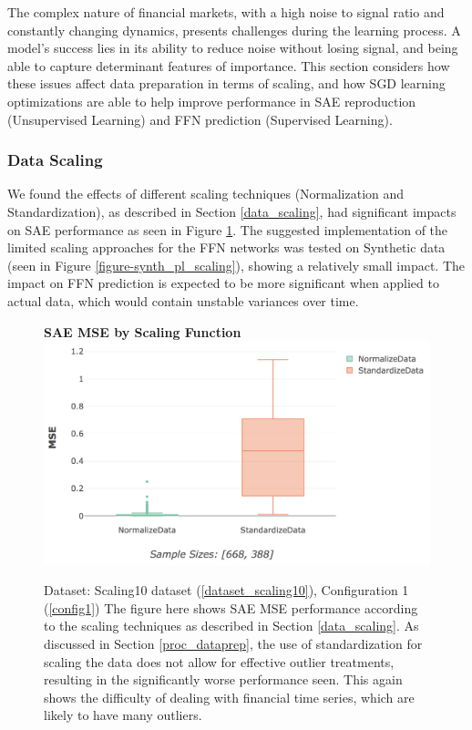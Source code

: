 \documentclass[a4paper,11pt,oneside]{article}
\theoremstyle{plain}
\theoremstyle{definition}
\begin{document}
	The complex nature of financial markets, with a high noise to signal ratio and constantly changing dynamics, presents challenges during the learning process. A model's success lies in its ability to reduce noise without losing signal, and being able to capture determinant features of importance. This section considers how these issues affect data preparation in terms of scaling, and how SGD learning optimizations are able to help improve performance in SAE reproduction (Unsupervised Learning) and FFN prediction (Supervised Learning).
	
	\subsubsection{Data Scaling}
	
	We found the effects of different scaling techniques (Normalization and Standardization), as described in Section \ref{data_scaling}, had significant impacts on SAE performance as seen in Figure \ref{figure-actual_mse_scaling}. The suggested implementation of the limited scaling approaches for the FFN networks was tested on Synthetic data (seen in Figure \ref{figure-synth_pl_scaling}), showing a relatively small impact. The impact on FFN prediction is expected to be more significant when applied to actual data, which would contain unstable variances over time.
		
	\begin{figure}[H]
		\centering 
		\textbf{SAE MSE by Scaling Function}
		\includegraphics[scale=0.4]{images/results/8_6_complexity/mse_scaling.png}
		\caption[SAE MSE by Scaling Function]
		{Dataset: Scaling10 dataset (\ref{dataset_scaling10}), Configuration 1 (\ref{config1})
			\newline The figure here shows SAE MSE performance according to the scaling techniques as described in Section \ref{data_scaling}. As discussed in Section \ref{proc_dataprep}, the use of standardization for scaling the data does not allow for effective outlier treatments, resulting in the significantly worse performance seen. This again shows the difficulty of dealing with financial time series, which are likely to have many outliers.}
		\label{figure-actual_mse_scaling}
	\end{figure}
\end{document}
